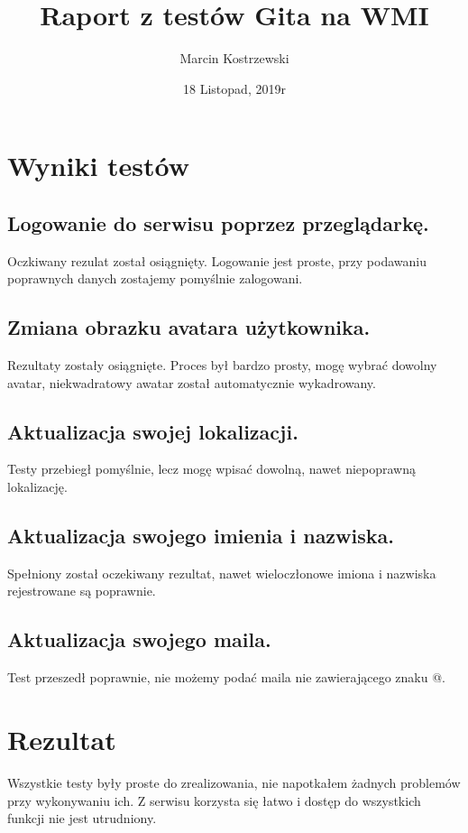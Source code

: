 \documentclass{article}
\title{Raport z testów Gita na WMI}
\author{Marcin Kostrzewski}
\date{18 Listopad, 2019r}
\begin{document}
\maketitle
\newpage

\section{Wyniki testów}

\subsection{Logowanie do serwisu poprzez przeglądarkę.}
Oczkiwany rezulat został osiągnięty. Logowanie jest proste, przy podawaniu poprawnych danych zostajemy pomyślnie zalogowani.

\subsection{Zmiana obrazku avatara użytkownika.}
Rezultaty zostały osiągnięte. Proces był bardzo prosty, mogę wybrać dowolny avatar, niekwadratowy awatar został automatycznie wykadrowany.

\subsection{Aktualizacja swojej lokalizacji.}
Testy przebiegł pomyślnie, lecz mogę wpisać dowolną, nawet niepoprawną lokalizację.

\subsection{Aktualizacja swojego imienia i nazwiska.}
Spełniony został oczekiwany rezultat, nawet wieloczłonowe imiona i nazwiska rejestrowane są poprawnie.

\subsection{Aktualizacja swojego maila.}
Test przeszedł poprawnie, nie możemy podać maila nie zawierającego znaku @. 

\section{Rezultat}
Wszystkie testy były proste do zrealizowania, nie napotkałem żadnych problemów przy wykonywaniu ich.
Z serwisu korzysta się łatwo i dostęp do wszystkich funkcji nie jest utrudniony.
\end{document}
